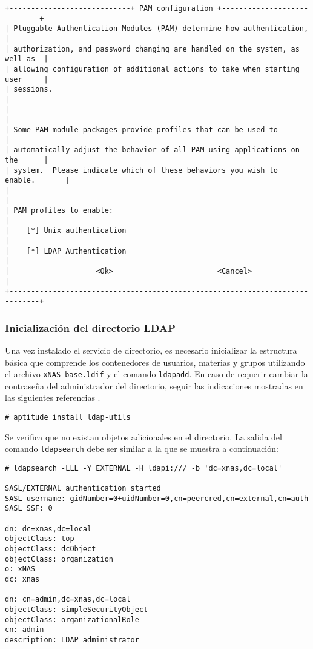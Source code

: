 {
\scriptsize
\linespread{1}
\begin{verbatim}
+----------------------------+ PAM configuration +----------------------------+
| Pluggable Authentication Modules (PAM) determine how authentication,        |
| authorization, and password changing are handled on the system, as well as  |
| allowing configuration of additional actions to take when starting user     |
| sessions.                                                                   |
|                                                                             |
| Some PAM module packages provide profiles that can be used to               |
| automatically adjust the behavior of all PAM-using applications on the      |
| system.  Please indicate which of these behaviors you wish to enable.       |
|                                                                             |
| PAM profiles to enable:                                                     |
|    [*] Unix authentication                                                  |
|    [*] LDAP Authentication                                                  |
|                    <Ok>                        <Cancel>                     |
+-----------------------------------------------------------------------------+
\end{verbatim}
}

          \subsubsection {Inicializaci\'{o}n del directorio \textsc{LDAP}}

Una vez instalado el servicio de directorio, es necesario inicializar la estructura b\'{a}sica que comprende los contenedores de usuarios, materias y grupos utilizando el archivo \texttt{xNAS-base.ldif} y el comando \texttt{ldapadd}. En caso de requerir cambiar la contrase\~{n}a del administrador del directorio, seguir las indicaciones mostradas en las siguientes referencias \cite{_change_????} \cite{_openldap_????}.

{
\scriptsize
\linespread{1}
\begin{verbatim}
# aptitude install ldap-utils
 \end{verbatim}
}

Se verifica que no existan objetos adicionales en el directorio. La salida del comando \texttt{ldapsearch} debe ser similar a la que se muestra a continuaci\'{o}n:

{
\scriptsize
\linespread{1}
\begin{verbatim}
# ldapsearch -LLL -Y EXTERNAL -H ldapi:/// -b 'dc=xnas,dc=local'

SASL/EXTERNAL authentication started
SASL username: gidNumber=0+uidNumber=0,cn=peercred,cn=external,cn=auth
SASL SSF: 0

dn: dc=xnas,dc=local
objectClass: top
objectClass: dcObject
objectClass: organization
o: xNAS
dc: xnas

dn: cn=admin,dc=xnas,dc=local
objectClass: simpleSecurityObject
objectClass: organizationalRole
cn: admin
description: LDAP administrator
 \end{verbatim}
}


